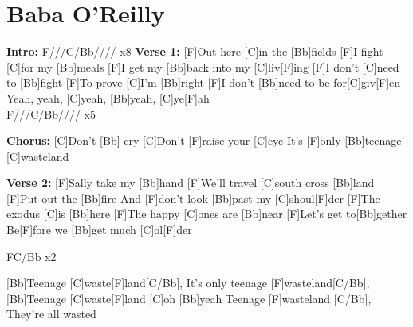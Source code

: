 \documentclass[../../songbookMain]{subfiles}
\begin{document}
\section{Baba O'Reilly}

\begin{guitar}
\begin{multicols}{2}
  \textbf{Intro:} F///C/Bb//// x8
  \textbf{Verse 1:}
  [F]Out here [C]in the [Bb]fields
  [F]I fight [C]for my [Bb]meals 
  [F]I get my [Bb]back into my [C]liv[F]ing  
  [F]I don't [C]need to [Bb]fight
  [F]To prove [C]I'm [Bb]right
  [F]I don't [Bb]need to be for[C]giv[F]en\\
 
  Yeah, yeah, [C]yeah, [Bb]yeah, [C]ye[F]ah\\
  
  F///C/Bb//// x5

  \textbf{Chorus:}
  [C]Don't [Bb] cry
  [C]Don't [F]raise your [C]eye
  It's [F]only [Bb]teenage [C]wasteland
  
  \textbf{Verse 2:}
 [F]Sally take my [Bb]hand
    [F]We'll travel [C]south cross [Bb]land
    [F]Put out the [Bb]fire
    And [F]don't look [Bb]past my [C]shoul[F]der
    [F]The exodus [C]is [Bb]here
    [F]The happy [C]ones are [Bb]near
    [F]Let's get to[Bb]gether
    Be[F]fore we [Bb]get much [C]ol[F]der
  
  FC/Bb x2
  
  [Bb]Teenage [C]waste[F]land[C/Bb],
  It's only teenage [F]wasteland[C/Bb],
  [Bb]Teenage [C]waste[F]land [C]oh [Bb]yeah
  Teenage [F]wasteland [C/Bb],
  They're all wasted
\end{multicols}
\end{guitar}
\end{document}
